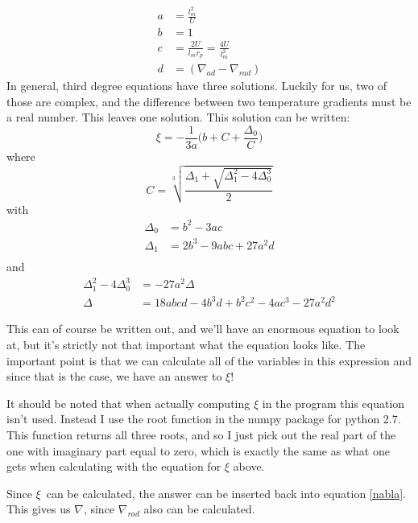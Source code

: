 \documentclass[a4paper,12pt]{article}
\begin{document}
\begin{equation}
\begin{aligned}
 a &= \frac{l_m^2}{U}\\
 b &= 1 \\
 c &= \frac{2U}{l_m r_p} = \frac{4U}{l_m^2}\\
 d &= (\nabla_{ad}- \nabla_{rad})
\end{aligned}
\end{equation}
In general, third degree equations have three solutions. Luckily for us, two of those are complex, and the difference between two temperature gradients must be a real number. 
This leaves one solution. This solution can be written:
\begin{equation}
 \xi  = -\frac{1}{3a}\bigg(b + C + \frac{\Delta_0}{C}\bigg)
\end{equation}
where 
\begin{equation}
 C = \sqrt[3]{\frac{\Delta_1 + \sqrt{\Delta_1^2 - 4\Delta_0^3}}{2}}
\end{equation}
with 
\begin{equation*}
\begin{aligned}
\Delta_0 &= b^2 - 3ac\\
\Delta_1 &= 2b^3 - 9abc + 27a^2 d\\
\end{aligned}
\end{equation*}
and
\begin{equation*}
\begin{aligned}
 \Delta_1^2 - 4\Delta_0^3 &= -27a^2\Delta\\
\Delta &= 18abcd -4b^3 d + b^2 c^2 - 4ac^3 -27a^2 d^2
\end{aligned}
\end{equation*}

This can of course be written out, and we'll have an enormous equation to look at, but it's strictly not that important what the equation looks like. The important point is that we can calculate all of the variables in this expression and since that is the case, we have an answer to $\xi$!

It should be noted that when actually computing $\xi$ in the program this equation isn't used. Instead I use the root function in the numpy package for python 2.7. This function returns all three roots, and so I just pick out the real part of the one with imaginary part equal to zero, which is exactly the same as what one gets when calculating with the equation for $\xi$ above.

Since $\xi$ can be calculated, the answer can be inserted back into equation \ref{nabla}.
This gives us $\nabla$, since $\nabla_{rad}$ also can be calculated.
\end{document}
